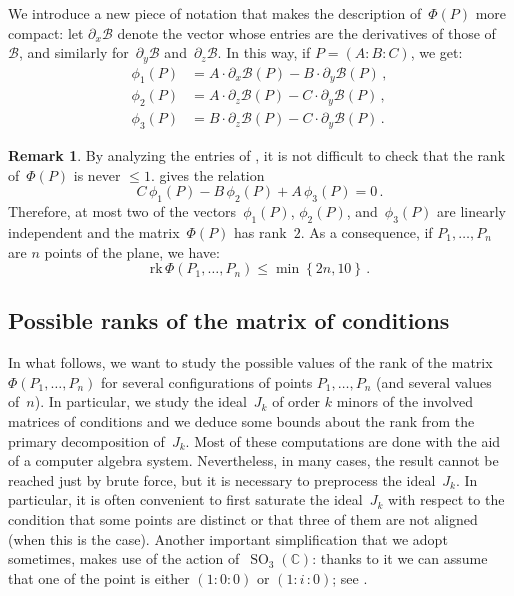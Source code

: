 \documentclass[a4paper, 11pt, reqno]{amsart}
\theoremstyle{plain}
\theoremstyle{definition}
\newtheorem{rmk}[lemma]{Remark}
\newcommand{\C}{\mathbb{C}}
\newcommand{\de}{\partial}
\newcommand{\iii}{\textit{i}\,}
\newcommand{\rk}{\ensuremath{\mathrm{rk}}}
\newcommand{\SO}{\operatorname{SO}}
\begin{document}
We introduce a new piece of notation that makes the description of~$\Phi(P)$ more compact: let $\de_x \mathcal{B}$ denote the vector whose entries are the derivatives of those of~$\mathcal{B}$, and similarly for~$\de_y \mathcal{B}$ and~$\de_z \mathcal{B}$.
In this way, if $P=(A: B: C)$, we get:
%
\begin{equation}
\label{equation:vector_conditions}
  \begin{aligned}
    \phi_1(P) &= A\cdot \de_x \mathcal{B}(P) - B\cdot \de_y \mathcal{B}(P) \,, \\
    \phi_2(P) &= A\cdot \de_z \mathcal{B}(P) - C\cdot \de_y \mathcal{B}(P) \,, \\
    \phi_3(P) &= B\cdot \de_z \mathcal{B}(P) - C\cdot \de_y \mathcal{B}(P) \,.
  \end{aligned}
\end{equation}
%
\begin{rmk}
By analyzing the entries of , it is not difficult to check that the rank of~$\Phi(P)$ is never $\leq 1$.  gives the relation
%
\begin{equation}
\label{eq:syzygy}
  C \, \phi_1(P) - B \, \phi_2(P) + A \, \phi_3(P) = 0 \,.
\end{equation}
%
Therefore, at most two of the vectors~$\phi_1(P)$, $\phi_2(P)$, and~$\phi_3(P)$ are linearly independent and the matrix~$\Phi(P)$ has rank~$2$.
As a consequence, if $P_1, \dots, P_n$ are $n$ points of the plane, we have:
%
\[
  \rk \,\Phi(P_1, \dots, P_n) \leq \min \left\{2n, 10 \right\} \,.
\]
%
\end{rmk}

\subsection{Possible ranks of the matrix of conditions}

In what follows, we want to study the possible values of the rank of the matrix
$\Phi(P_1, \dots, P_n)$ for several configurations of points $P_1, \dots, P_n$
(and several values of~$n$).
In particular, we study the ideal~$J_k$ of order $k$ minors of the
involved matrices of conditions and we deduce some bounds about the rank from the primary
decomposition of~$J_k$. 
Most of these computations are done with the aid of a computer algebra system.
Nevertheless, in many cases, the result cannot be reached just by brute force, 
but it is necessary to preprocess the ideal~$J_k$. 
In particular, it is often convenient to first saturate the ideal~$J_k$ with respect to
the condition that some points are distinct or that three of them are not aligned 
(when this is the case). 
Another important simplification that we adopt sometimes, makes use
of the action of~$\SO_3(\C)$: thanks to it we can assume that one of
the point is either $(1: 0: 0)$ or $(1: \iii: 0)$; see .
\end{document}

